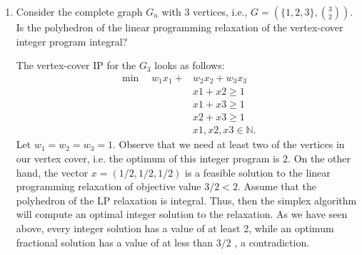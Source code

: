 \documentclass[11pt]{article}
\newcommand{\setR}{\mathbb{R}}
\newcommand{\setN}{\mathbb{N}}
\begin{document}
\begin{enumerate}[1)]
\item Consider the complete graph $G_n$ with 3 vertices, i.e., $G= (\{1,2,3\}, \binom{3}
{2} )$. Is the polyhedron of the linear programming relaxation of the vertex-cover integer program integral?

\begin{solution}
The vertex-cover IP for the $G_3$ looks as follows:
\begin{align*}
\min \quad w_1x_1 + & w_2x_2 + w_3x_3\\
&x1 + x2  ≥ 1\\
&x1 + x3 ≥ 1\\
&x2 + x3 ≥ 1\\
&x1, x2, x3 ∈ \setN.
\end{align*}
Let $w_1 = w_2 = w_3 = 1$. Observe that we need at least two of the vertices in our vertex cover,
i.e. the optimum of this integer program is $2$. On the other hand, the vector $x =(1/2, 1/2, 1/2)$ is a
feasible solution to the linear programming relaxation of objective value $3/2 < 2$.
Assume that the polyhedron of the LP relaxation is integral. Thus, then the simplex algorithm will compute an optimal integer solution to the relaxation.
As we have seen above, every integer solution has a value of at least 2, while an optimum
fractional solution has a value of at less than $3/2$ , a contradiction.
\end{solution}





\end{enumerate}
\end{document}
